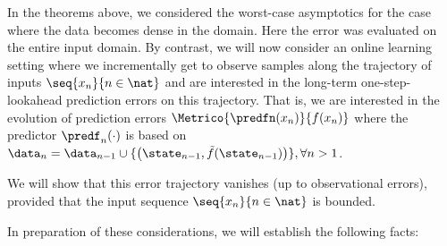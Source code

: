 In the theorems above, we considered the worst-case asymptotics for the case where the data becomes dense in the domain. Here the error was evaluated on the entire input domain. By contrast, we will now consider an online learning setting where we incrementally get to observe samples along the trajectory of inputs $\seq{x_n}{n \in \nat }$ and are interested in the long-term one-step-lookahead prediction errors on this trajectory.
That is, we are interested in the evolution of prediction errors $\Metrico{\predfn(x_n)}{f(x_n) }$
where the predictor $\predf_{n}(\cdot)$ is based on $\data_{n} = \data_{n-1} \cup \{ \bigl(\state_{n-1}, \tilde f(\state_{n-1}) \bigr)\}, \forall n >1 $. 

We will show that this error trajectory vanishes (up to observational errors), provided that the input sequence $\seq{x_n}{n \in \nat}$ is bounded.

In preparation of these considerations, we will establish the following facts:

